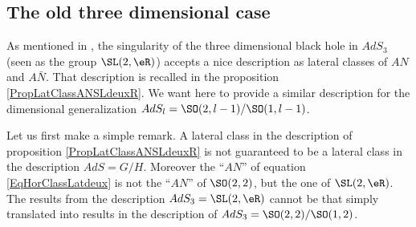 					\subsection{The old three dimensional case}

As mentioned in \cite{Keio}, the singularity of the three dimensional black hole in $AdS_3$ (seen as the group $\SL(2,\eR)$) accepts a nice description as lateral classes of $AN$ and $A\bar N$. That description is recalled in the proposition \ref{PropLatClassANSLdeuxR}. We want here to provide a similar description for the dimensional generalization $AdS_l=\SO(2,l-1)/\SO(1,l-1)$. 

Let us first make a simple remark. A lateral class in the description of proposition \ref{PropLatClassANSLdeuxR} is not guaranteed to be a lateral class in the description $AdS=G/H$. Moreover the ``$AN$'' of equation  \eqref{EqHorClassLatdeux} is not the ``$AN$'' of $\SO(2,2)$, but the one of $\SL(2,\eR)$. The results from the description $AdS_3=\SL(2,\eR)$ cannot be that simply translated into results in the description of $AdS_3=\SO(2,2)/\SO(1,2)$.

